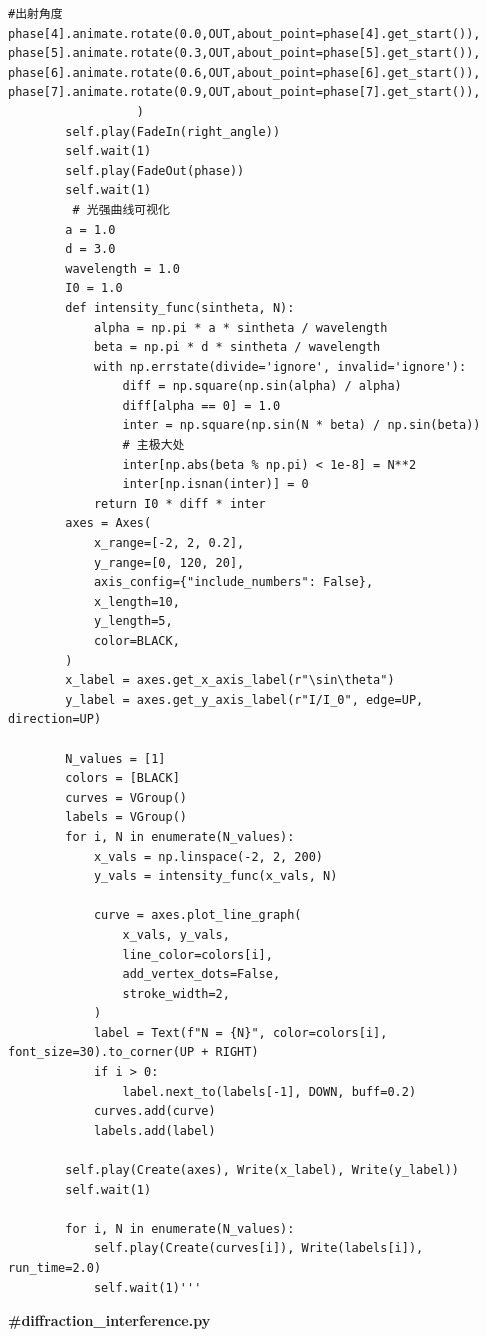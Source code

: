 \documentclass[12pt,a4paper]{ctexrep}
\begin{document}
\begin{lstlisting}[style=pycode]
                  #出射角度
phase[4].animate.rotate(0.0,OUT,about_point=phase[4].get_start()),
phase[5].animate.rotate(0.3,OUT,about_point=phase[5].get_start()),
phase[6].animate.rotate(0.6,OUT,about_point=phase[6].get_start()),
phase[7].animate.rotate(0.9,OUT,about_point=phase[7].get_start()),
                  )
        self.play(FadeIn(right_angle))
        self.wait(1)
        self.play(FadeOut(phase))
        self.wait(1)
         # 光强曲线可视化
        a = 1.0
        d = 3.0
        wavelength = 1.0
        I0 = 1.0
        def intensity_func(sintheta, N):
            alpha = np.pi * a * sintheta / wavelength
            beta = np.pi * d * sintheta / wavelength
            with np.errstate(divide='ignore', invalid='ignore'):
                diff = np.square(np.sin(alpha) / alpha)
                diff[alpha == 0] = 1.0
                inter = np.square(np.sin(N * beta) / np.sin(beta))
                # 主极大处
                inter[np.abs(beta % np.pi) < 1e-8] = N**2
                inter[np.isnan(inter)] = 0
            return I0 * diff * inter
        axes = Axes(
            x_range=[-2, 2, 0.2],
            y_range=[0, 120, 20],
            axis_config={"include_numbers": False},
            x_length=10,
            y_length=5,
            color=BLACK,
        )
        x_label = axes.get_x_axis_label(r"\sin\theta")
        y_label = axes.get_y_axis_label(r"I/I_0", edge=UP, direction=UP)

        N_values = [1]
        colors = [BLACK]
        curves = VGroup()
        labels = VGroup()
        for i, N in enumerate(N_values):
            x_vals = np.linspace(-2, 2, 200)
            y_vals = intensity_func(x_vals, N)

            curve = axes.plot_line_graph(
                x_vals, y_vals,
                line_color=colors[i],
                add_vertex_dots=False,
                stroke_width=2,
            )
            label = Text(f"N = {N}", color=colors[i], font_size=30).to_corner(UP + RIGHT)
            if i > 0:
                label.next_to(labels[-1], DOWN, buff=0.2)
            curves.add(curve)
            labels.add(label)

        self.play(Create(axes), Write(x_label), Write(y_label))
        self.wait(1)

        for i, N in enumerate(N_values):
            self.play(Create(curves[i]), Write(labels[i]), run_time=2.0)
            self.wait(1)'''
\end{lstlisting}

\textbf{\#diffraction\_interference.py}
\end{document}

